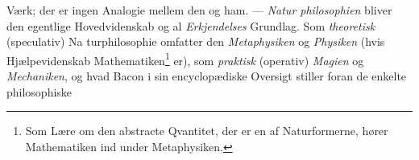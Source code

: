 \documentclass[12pt,a4paper]{book}
\begin{document}
Værk; der er ingen Analogie mellem den og ham. --- \emph{Natur\-%
\setcounter{footnote}{0}%
philosophien} bliver den egentlige Hovedvidenskab og al
\emph{Erkjendelses} Grundlag. Som \emph{theoretisk} (speculativ) Na\-%
turphilosophie omfatter den \emph{Metaphysiken} og \emph{Physiken}
(hvis Hjælpevidenskab Mathematiken\footnote{Som Lære om den abstracte Qvantitet, der er en af Naturformerne,
hører Mathematiken ind under Metaphysiken.} er), som \emph{praktisk}
(operativ) \emph{Magien} og \emph{Mechaniken}, og hvad Bacon i sin
encyclopædiske Oversigt stiller foran de enkelte philosophiske
\end{document}
